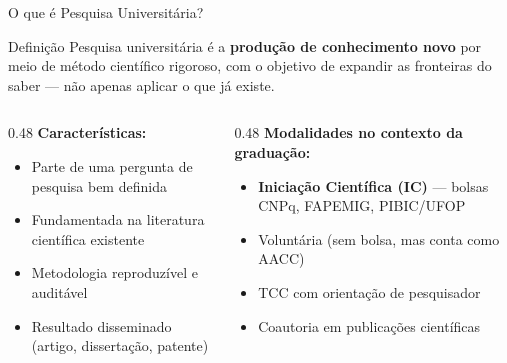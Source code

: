 \documentclass[aspectratio=169]{beamer}
\newcommand{\impt}[1]{\textcolor{morange}{\textbf{#1}}}
\newcommand{\ntc}[1]{\textcolor{mblue}{#1}}
\begin{document}
\begin{frame}{O que é Pesquisa Universitária?}
  \begin{block}{Definição}
    Pesquisa universitária é a \impt{produção de conhecimento novo} por meio de método científico rigoroso, com o objetivo de expandir as fronteiras do saber --- não apenas aplicar o que já existe.
  \end{block}
  \vspace{0.3cm}
  \begin{columns}[T]
    \begin{column}{0.48\textwidth}
      \textbf{Características:}
      \begin{itemize}\setlength\itemsep{3pt}
        \item Parte de uma \ntc{pergunta de pesquisa} bem definida
        \item Fundamentada na literatura científica existente
        \item Metodologia reproduzível e auditável
        \item Resultado disseminado (artigo, dissertação, patente)
      \end{itemize}
    \end{column}
    \begin{column}{0.48\textwidth}
      \textbf{Modalidades no contexto da graduação:}
      \begin{itemize}\setlength\itemsep{3pt}
        \item \impt{Iniciação Científica (IC)} --- bolsas CNPq, FAPEMIG, PIBIC/UFOP
        \item Voluntária (sem bolsa, mas conta como AACC)
        \item TCC com orientação de pesquisador
        \item Coautoria em publicações científicas
      \end{itemize}
    \end{column}
  \end{columns}
\end{frame}
\end{document}
